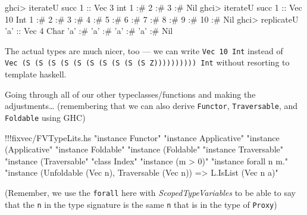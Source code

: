 \documentclass[]{article}
\newenvironment{Shaded}{}{}
\newcommand{\DataTypeTok}[1]{\textcolor[rgb]{0.56,0.13,0.00}{{#1}}}
\newcommand{\DecValTok}[1]{\textcolor[rgb]{0.25,0.63,0.44}{{#1}}}
\newcommand{\CharTok}[1]{\textcolor[rgb]{0.25,0.44,0.63}{{#1}}}
\newcommand{\StringTok}[1]{\textcolor[rgb]{0.25,0.44,0.63}{{#1}}}
\newcommand{\OtherTok}[1]{\textcolor[rgb]{0.00,0.44,0.13}{{#1}}}
\newcommand{\FunctionTok}[1]{\textcolor[rgb]{0.02,0.16,0.49}{{#1}}}
\newcommand{\NormalTok}[1]{{#1}}
\begin{document}
\begin{Shaded}
\begin{Highlighting}[]
\NormalTok{ghci}\FunctionTok{>} \NormalTok{iterateU succ }\DecValTok{1}\OtherTok{ ::} \DataTypeTok{Vec} \DecValTok{3} \NormalTok{int}
\DecValTok{1} \FunctionTok{:#} \DecValTok{2} \FunctionTok{:#} \DecValTok{3} \FunctionTok{:#} \DataTypeTok{Nil}
\NormalTok{ghci}\FunctionTok{>} \NormalTok{iterateU succ }\DecValTok{1}\OtherTok{ ::} \DataTypeTok{Vec} \DecValTok{10} \DataTypeTok{Int}
\DecValTok{1} \FunctionTok{:#} \DecValTok{2} \FunctionTok{:#} \DecValTok{3} \FunctionTok{:#} \DecValTok{4} \FunctionTok{:#} \DecValTok{5} \FunctionTok{:#} \DecValTok{6} \FunctionTok{:#} \DecValTok{7} \FunctionTok{:#} \DecValTok{8} \FunctionTok{:#} \DecValTok{9} \FunctionTok{:#} \DecValTok{10} \FunctionTok{:#} \DataTypeTok{Nil}
\NormalTok{ghci}\FunctionTok{>} \NormalTok{replicateU }\CharTok{'a'}\OtherTok{ ::} \DataTypeTok{Vec} \DecValTok{4} \DataTypeTok{Char}
\CharTok{'a'} \FunctionTok{:#} \CharTok{'a'} \FunctionTok{:#} \CharTok{'a'} \FunctionTok{:#} \CharTok{'a'} \FunctionTok{:#} \DataTypeTok{Nil}
\end{Highlighting}
\end{Shaded}

The actual types are much nicer, too --- we can write
\texttt{Vec\ 10\ Int} instead of
\texttt{Vec\ (S\ (S\ (S\ (S\ (S\ (S\ (S\ (S\ (S\ (S\ Z))))))))))\ Int}
without resorting to template haskell.

Going through all of our other typeclasses/functions and making the
adjustments\ldots{} (remembering that we can also derive
\texttt{Functor}, \texttt{Traversable}, and \texttt{Foldable} using GHC)

\begin{Shaded}
\begin{Highlighting}[]
\FunctionTok{!!!}\NormalTok{fixvec}\FunctionTok{/}\NormalTok{FVTypeLits.hs }\StringTok{"instance Functor"} \StringTok{"instance Applicative"} \StringTok{"instance (Applicative"} \StringTok{"instance Foldable"} \StringTok{"instance (Foldable"} \StringTok{"instance Traversable"} \StringTok{"instance (Traversable"} \StringTok{"class Index"} \StringTok{"instance (m > 0)"} \StringTok{"instance forall n m."} \StringTok{"instance (Unfoldable (Vec n), Traversable (Vec n)) => L.IsList (Vec n a)"}
\end{Highlighting}
\end{Shaded}

(Remember, we use the \texttt{forall} here with
\emph{ScopedTypeVariables} to be able to say that the \texttt{n} in the
type signature is the same \texttt{n} that is in the type of
\texttt{Proxy})
\end{document}
